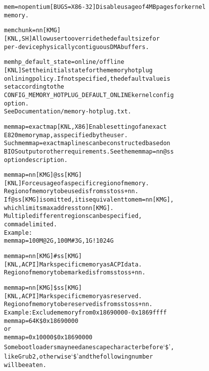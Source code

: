 \documentclass[a4paper,8pt,english]{sphinxmanual}
\begin{document}
\begin{alltt}
        mem=nopentium   {[}BUGS=X86-32{]} Disable usage of 4MB pages for kernel
                        memory.

        memchunk=nn{[}KMG{]}
                        {[}KNL,SH{]} Allow user to override the default size for
                        per-device physically contiguous DMA buffers.

        memhp\_default\_state=online/offline
                        {[}KNL{]} Set the initial state for the memory hotplug
                        onlining policy. If not specified, the default value is
                        set according to the
                        CONFIG\_MEMORY\_HOTPLUG\_DEFAULT\_ONLINE kernel config
                        option.
                        See Documentation/memory-hotplug.txt.

        memmap=exactmap {[}KNL,X86{]} Enable setting of an exact
                        E820 memory map, as specified by the user.
                        Such memmap=exactmap lines can be constructed based on
                        BIOS output or other requirements. See the memmap=nn@ss
                        option description.

        memmap=nn{[}KMG{]}@ss{[}KMG{]}
                        {[}KNL{]} Force usage of a specific region of memory.
                        Region of memory to be used is from ss to ss+nn.
                        If @ss{[}KMG{]} is omitted, it is equivalent to mem=nn{[}KMG{]},
                        which limits max address to nn{[}KMG{]}.
                        Multiple different regions can be specified,
                        comma delimited.
                        Example:
                                memmap=100M@2G,100M\#3G,1G!1024G

        memmap=nn{[}KMG{]}\#ss{[}KMG{]}
                        {[}KNL,ACPI{]} Mark specific memory as ACPI data.
                        Region of memory to be marked is from ss to ss+nn.

        memmap=nn{[}KMG{]}\$ss{[}KMG{]}
                        {[}KNL,ACPI{]} Mark specific memory as reserved.
                        Region of memory to be reserved is from ss to ss+nn.
                        Example: Exclude memory from 0x18690000-0x1869ffff
                                 memmap=64K\$0x18690000
                                 or
                                 memmap=0x10000\$0x18690000
                        Some bootloaders may need an escape character before `\$',
                        like Grub2, otherwise `\$' and the following number
                        will be eaten.


\end{alltt}
\end{document}
